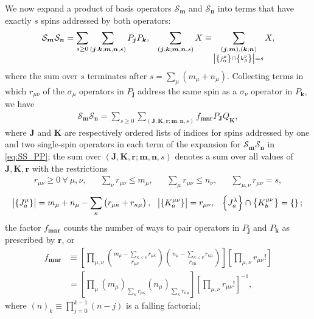 \documentclass[aps,notitlepage,nofootinbib,11pt]{revtex4-1}
\newcommand{\p}[1]{\left(#1\right)} %
\renewcommand{\sp}[1]{\left[#1\right]} %
\renewcommand{\set}[1]{\left\{#1\right\}} %
\renewcommand{\v}{\bm} %
\renewcommand{\S}{\mathcal{S}}
\newcommand{\1}{\mathds{1}}
\begin{document}
We now expand a product of basis operators $\S_{\v m}$ and $\S_{\v n}$
into terms that have exactly $s$ spins addressed by both operators:
\begin{align}
  \S_{\v m} \S_{\v n}
  = \sum_{s\ge0} \sum_{\p{\v j,\v k;\v m,\v n,s}} P_{\v j} P_{\v k},
  &&
  \sum_{\p{\v j,\v k;\v m,\v n,s}} X \equiv
  \sum_{\substack{\p{\v j;\v m},\p{\v k;\v n} \\
      \abs{\set{j_\alpha^\mu}\cap\set{k_\beta^\nu}}=s}} X,
  \label{eq:SS_PP}
\end{align}
where the sum over $s$ terminates after $s = \sum_\mu\p{m_\mu+n_\mu}$.
Collecting terms in which $r_{\mu\nu}$ of the $\sigma_\mu$ operators
in $P_{\v j}$ address the same spin as a $\sigma_\nu$ operator in
$P_{\v k}$, we have
\begin{align}
  \S_{\v m}\S_{\v n}
  = \sum_{s\ge0} \sum_{\p{\v J,\v K,\v r;\v m,\v n,s}}
  f_{\v m\v n\v r} P_{\v J} Q_{\v K},
  \label{eq:SS_PQ}
\end{align}
where $\v J$ and $\v K$ are respectively ordered lists of indices for
spins addressed by one and two single-spin operators in each term of
the expansion for $\S_{\v m} \S_{\v n}$ in \eqref{eq:SS_PP}; the sum
over $\p{\v J,\v K,\v r;\v m,\v n,s}$ denotes a sum over all values of
$\v J,\v K,\v r$ with the restrictions
\begin{align}
  r_{\mu\nu} \ge 0 ~\forall~ \mu,\nu,
  &&
  \sum_\nu r_{\mu\nu} \le m_\mu,
  &&
  \sum_\mu r_{\mu\nu} \le n_\nu,
  &&
  \sum_{\mu,\nu} r_{\mu\nu} = s,
\end{align}
\begin{align}
  \abs{\set{J_a^\mu}}
  = m_\mu + n_\mu - \sum_\kappa\p{r_{\mu\kappa}+r_{\kappa\mu}},
  &&
  \abs{\set{K^{\mu\nu}_a}} = r_{\mu\nu},
  &&
  \set{J_a^\lambda} \cap \set{K_b^{\mu\nu}} = \set{};
\end{align}
the factor $f_{\v m\v n\v r}$ counts the number of ways to pair
operators in $P_{\v j}$ and $P_{\v k}$ as prescribed by $\v r$, or
\begin{align}
  f_{\v m\v n\v r}
  &\equiv \sp{\prod_{\mu,\nu}
    { m_\mu - \sum_{\kappa<\nu} r_{\mu\kappa} \choose r_{\mu\nu} }
    { n_\mu - \sum_{\kappa<\nu} r_{\kappa\mu} \choose r_{\nu\mu} }}
  \sp{\prod_{\mu,\nu} r_{\mu\nu}!} \\
  &= \sp{\prod_\mu \p{m_\mu}_{\sum_\kappa r_{\mu\kappa}}
    \p{n_\mu}_{\sum_\kappa r_{\kappa\mu}}}
  \sp{\prod_{\mu,\nu} r_{\mu\nu}!}^{-1},
\end{align}
where $\p{n}_k\equiv\prod_{j=0}^{k-1}\p{n-j}$ is a falling factorial;
\end{document}
